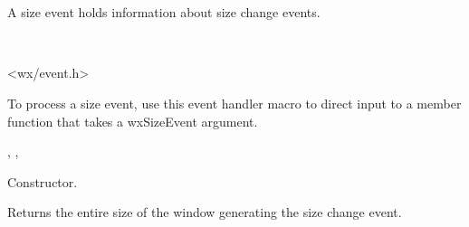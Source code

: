 \section{}\label{wxsizeevent}

A size event holds information about size change events.


\\


<wx/event.h>


To process a size event, use this event handler macro to direct input to a member
function that takes a wxSizeEvent argument.

\twocolwidtha{7cm}
\begin{twocollist}\itemsep=0pt
\end{twocollist}%


, , 




Constructor.

\label{wxsizeeventgetsize}


Returns the entire size of the window generating the size change event.

